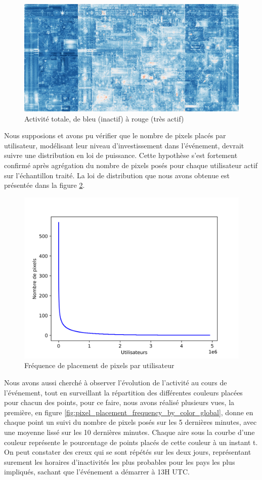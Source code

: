 \documentclass[a4paper]{article}
\begin{document}
{\begin{figure}[h]
    \centering
    \includegraphics[width=.95\linewidth]{activite_total.png}
    \caption{Activité totale, de bleu (inactif) à rouge (très actif)}
    \label{fig:activite_total}
\end{figure}


Nous supposions et avons pu vérifier que le nombre de pixels placés par utilisateur, modélisant leur niveau d'investissement dans l'événement, devrait suivre une distribution en loi de puissance. Cette hypothèse s'est fortement confirmé après agrégation du nombre de pixels posés pour chaque utilisateur actif sur l'échantillon traité. La loi de distribution que nous avons obtenue est présentée dans la figure \ref{fig:pixel_placement_frequency_by_user}.

\begin{figure}[h]
    \centering
    \includegraphics[width=.50\linewidth]{pixel_placement_frequency_by_user.png}
    \caption{Fréquence de placement de pixels par utilisateur}
    \label{fig:pixel_placement_frequency_by_user}
\end{figure}

Nous avons aussi cherché à observer l'évolution de l'activité au cours de l'événement, tout en surveillant la répartition des différentes couleurs placées pour chacun des points, pour ce faire, nous avons réalisé plusieurs vues, la première, en figure \ref{fig:pixel_placement_frequency_by_color_global}, donne en chaque point un suivi du nombre de pixels posés sur les 5 dernières minutes, avec une moyenne lissé sur les 10 dernières minutes. Chaque aire sous la courbe d'une couleur représente le pourcentage de points placés de cette couleur à un instant t. On peut constater des creux qui se sont répétés sur les deux jours, représentant surement les horaires d'inactivités les plus probables pour les pays les plus impliqués, sachant que l'événement a démarrer à 13H UTC.

}
\end{document}
